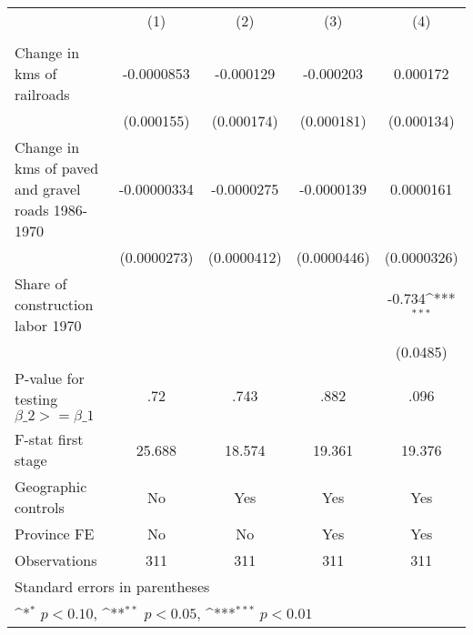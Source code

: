 {
\def\sym#1{\ifmmode^{#1}\else\(^{#1}\)\fi}
\begin{tabular}{l*{4}{c}}
\hline\hline
                &\multicolumn{1}{c}{(1)}&\multicolumn{1}{c}{(2)}&\multicolumn{1}{c}{(3)}&\multicolumn{1}{c}{(4)}\\
                &\multicolumn{1}{c}{}&\multicolumn{1}{c}{}&\multicolumn{1}{c}{}&\multicolumn{1}{c}{}\\
\hline
Change in kms of railroads&-0.0000853         &-0.000129         &-0.000203         & 0.000172         \\
                &(0.000155)         &(0.000174)         &(0.000181)         &(0.000134)         \\
[1em]
Change in kms of paved and gravel roads 1986-1970&-0.00000334         &-0.0000275         &-0.0000139         &0.0000161         \\
                &(0.0000273)         &(0.0000412)         &(0.0000446)         &(0.0000326)         \\
[1em]
Share of construction labor 1970&                  &                  &                  &   -0.734\sym{***}\\
                &                  &                  &                  & (0.0485)         \\
\hline
P-value for testing $\beta\_{2} >= \beta\_{1}$&      .72         &     .743         &     .882         &     .096         \\
F-stat first stage&   25.688         &   18.574         &   19.361         &   19.376         \\
Geographic controls&       No         &      Yes         &      Yes         &      Yes         \\
Province FE     &       No         &       No         &      Yes         &      Yes         \\
Observations    &      311         &      311         &      311         &      311         \\
\hline\hline
\multicolumn{5}{l}{\footnotesize Standard errors in parentheses}\\
\multicolumn{5}{l}{\footnotesize \sym{*} \(p<0.10\), \sym{**} \(p<0.05\), \sym{***} \(p<0.01\)}\\
\end{tabular}
}
